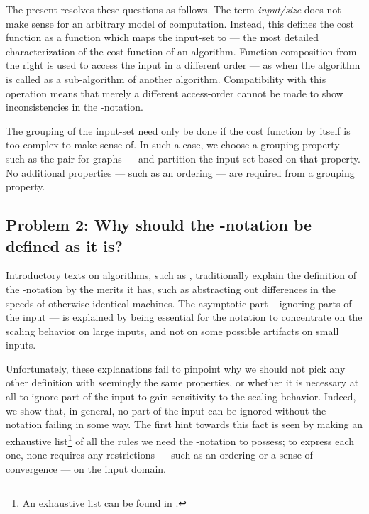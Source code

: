 \documentclass[b5paper, english, oneside]{memoir}
\begin{document}
The present \manuscript{} resolves these questions as follows. The term \emph{input\-/size} does not make sense for an arbitrary model of computation. Instead, this \manuscript{} defines the cost function as a function which maps the input-set to  --- the most detailed characterization of the cost function of an algorithm. Function composition from the right is used to access the input in a different order --- as when the algorithm is called as a sub-algorithm of another algorithm. Compatibility with this operation means that merely a different access-order cannot be made to show inconsistencies in the -notation. 

The grouping of the input-set need only be done if the cost function by itself is too complex to make sense of. In such a case, we choose a grouping property --- such as the pair  for graphs --- and partition the input-set based on that property. No additional properties --- such as an ordering --- are required from a grouping property.

\subsection{Problem 2: Why should the \texorpdfstring{}{O}-notation be defined as it is?}

Introductory texts on algorithms, such as \cite{IntroAlgo}, traditionally explain the definition of the -notation by the merits it has, such as abstracting out differences in the speeds of otherwise identical machines. The asymptotic part -- ignoring parts of the input --- is explained by being essential for the notation to concentrate on the scaling behavior on large inputs, and not on some possible artifacts on small inputs. 

Unfortunately, these explanations fail to pinpoint why we should not pick any other definition with seemingly the same properties, or whether it is necessary at all to ignore part of the input to gain sensitivity to the scaling behavior. Indeed, we show that, in general, no part of the input can be ignored without the notation failing in some way. The first hint towards this fact is seen by making an exhaustive list\footnote{An exhaustive list can be found in .} of all the rules we need the -notation to possess; to express each one, none requires any restrictions --- such as an ordering or a sense of convergence --- on the input domain. 
\end{document}
